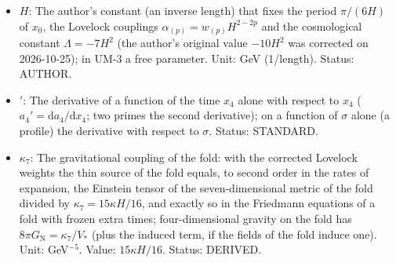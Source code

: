 \documentclass[
  10pt,
]{article}
\begin{document}
\begin{itemize}
  Status: STANDARD.
\item
  \(H\): The author's constant (an inverse length) that fixes the period
  \(\pi/(6H)\) of \(x_0\), the Lovelock couplings
  \(\alpha_{(p)} = w_{(p)}H^{2-2p}\) and the cosmological constant
  \(\Lambda = -7H^2\) (the author's original value \(-10H^2\) was
  corrected on 2026-10-25); in UM-3 a free parameter. Unit: GeV
  (1/length). Status: AUTHOR.
\item
  \({}'\): The derivative of a function of the time \(x_4\) alone with
  respect to \(x_4\) (\(a_4' = \mathrm{d}a_4/\mathrm{d}x_4\); two primes
  the second derivative); on a function of \(\sigma\) alone (a profile)
  the derivative with respect to \(\sigma\). Status: STANDARD.
\item
  \(\kappa_7\): The gravitational coupling of the fold: with the
  corrected Lovelock weights the thin source of the fold equals, to
  second order in the rates of expansion, the Einstein tensor of the
  seven-dimensional metric of the fold divided by
  \(\kappa_7 = 15\kappa H/16\), and exactly so in the Friedmann
  equations of a fold with frozen extra times; four-dimensional gravity
  on the fold has \(8\pi G_{\mathrm{N}} = \kappa_7/V_*\) (plus the
  induced term, if the fields of the fold induce one). Unit:
  GeV\(^{-5}\). Value: \(15\kappa H/16\). Status: DERIVED.
\end{itemize}
\end{document}
